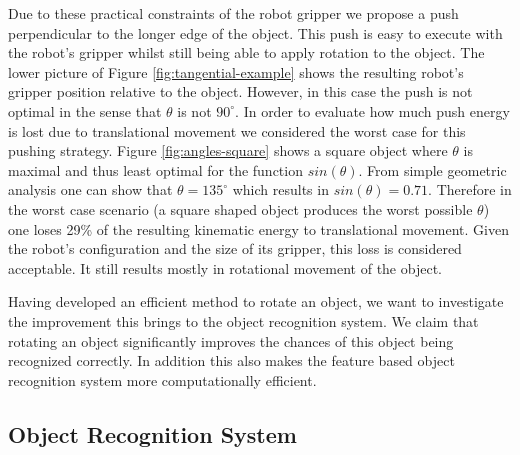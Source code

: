 Due to these practical constraints of the robot gripper we propose a push perpendicular to the longer edge of the object. This push is easy to execute with the robot's gripper whilst still being able to apply rotation to the object. The lower picture of Figure \ref{fig:tangential-example} shows the resulting robot's gripper position relative to the object. However, in this case the push is not optimal in the sense that $\theta$ is not $90 ^\circ$. In order to evaluate how much push energy is lost due to translational movement we considered the worst case for this pushing strategy.  Figure \ref{fig:angles-square} shows a square object where $\theta$ is maximal and thus least optimal for the function $sin(\theta)$. From simple geometric analysis one can show that $\theta =135 ^\circ$ which results in $sin(\theta) = 0.71$.  Therefore in the worst case scenario (a square shaped object produces the worst possible $\theta$) one loses 29\% of the resulting kinematic energy to translational movement. Given the robot's configuration and the size of its gripper, this loss is considered acceptable.  It still results mostly in rotational movement of the object. 

Having developed an efficient method to rotate an object, we want to investigate the improvement this brings to the object recognition system. We claim that rotating an object significantly improves the chances of this object being recognized correctly. In addition this also makes the feature based object recognition system more computationally efficient.

\subsection{Object Recognition System}

